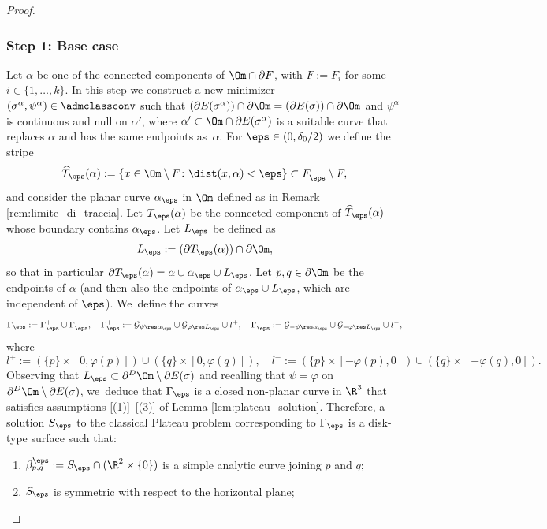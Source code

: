 \begin{proof}
\subsubsection*{Step 1: Base case} Let $\alpha$ be one of the connected components of $\Om\cap\partial F$, with $F:=F_i$ for some $i\in\{1,\dots,k\}$.
In this step we construct a new minimizer $(\sigma^\alpha,\psi^\alpha)\in\admclassconv$ such that $(\partial E(\sigma^\alpha))\cap\partial\Om=(\partial E(\sigma))\cap\partial\Om$
and
$\psi^\alpha$ is continuous and null on $\alpha'$, where
$\alpha'\subset\Om\cap\partial E(\sigma^\alpha)$ is a suitable curve that replaces $\alpha$ and has the same endpoints as~$\alpha$.
For $\eps\in(0,\delta_0/2)$ we define the stripe
\[
\widehat T_\eps(\alpha):=\{x\in\Om\setminus F\colon\dist(x,\alpha)<\eps\}\subset F^+_\eps\setminus F,
\]
and consider the planar curve $\alpha_\eps$ in $\overline\Om$ defined as in Remark \ref{rem:limite_di_traccia}.
Let $T_\eps(\alpha)$ be the connected component of $\widehat T_\eps(\alpha)$ whose boundary contains $\alpha_\eps$. Let $L_\eps$ be defined as
\[
 L_\eps:=(\partial T_\eps(\alpha))\cap \partial\Om,
\]
so that in particular
$\partial T_\eps(\alpha)=\alpha\cup\alpha_\eps\cup L_\eps $.
Let $p,q\in \partial\Om$ be the endpoints of $\alpha$ (and then also the endpoints of $\alpha_\eps\cup L_\eps$, which are independent of $\eps$). We~define the curves
\[
\Gamma_\eps:=\Gamma_\eps^+\cup\Gamma_\eps^-,\quad
\Gamma_\eps^+:=\mathcal{G}_{\psi\res\alpha_\eps}\cup \mathcal{G}_{\varphi\res L_\eps}\cup l^+,\quad \Gamma_\eps^-:=\mathcal{G}_{-\psi\res\alpha_\eps}\cup \mathcal{G}_{-\varphi\res L_\eps}\cup l^-,
\]
where
\begin{equation*}
l^+:=(\{p\}\times[0,\varphi(p)])\cup (\{q\}\times[0,\varphi(q)]),\quad
l^-:=(\{p\}\times[-\varphi(p),0])\cup(\{q\}\times[-\varphi(q),0]).
\end{equation*}
Observing that $L_\eps\subset\partial^D\Om\setminus\partial E(\sigma)$ and recalling that $\psi=\varphi$ on $\partial^D\Om\setminus\partial E(\sigma)$, we~deduce that
$\Gamma_\eps$ is a closed non-planar curve in $\R^3$ that satisfies assumptions \ref{(1)}--\ref{(3)} of Lemma \ref{lem:plateau_solution}.
Therefore, a solution $S_\eps$ to the classical Plateau problem corresponding to $\Gamma_\eps$ is a disk-type surface such that:
\begin{enumerate}[{\rm (1)},wide]
\item $\beta_{p,q}^\eps:=S_\eps\cap(\R^2\times\{0\})$ is a simple analytic curve joining $p$ and $q$;
\item $S_\eps$ is symmetric with respect to the horizontal plane;

\end{enumerate}
\end{proof}
